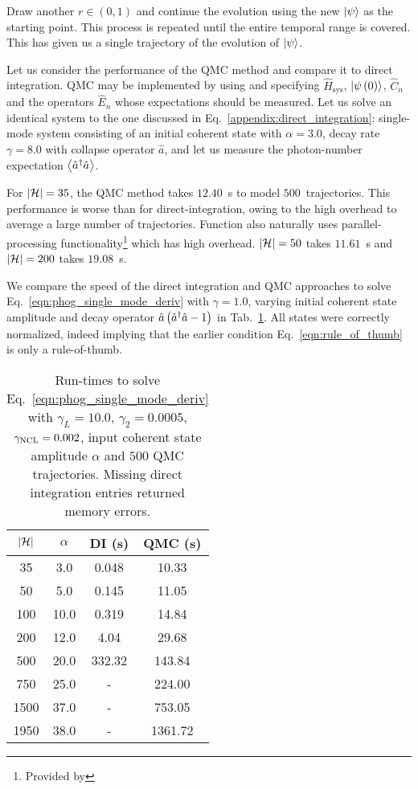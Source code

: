 \noindent Draw another $r \in \left(0, 1\right)$ and continue the evolution using the new $\ket{\psi}$ as the starting point. This process is repeated until the entire temporal range is covered. This has given us a single trajectory of the evolution of $\ket{\psi}$. 

Let us consider the performance of the QMC method and compare it to direct integration. QMC may be implemented by using  and specifying $\hat{H}_{\text{sys}}$, $\ket{\psi\left(0\right)}$, $\hat{C}_n$ and the operators $\hat{E}_n$ whose expectations should be measured. Let us solve an identical system to the one discussed in Eq.~\ref{appendix:direct_integration}: single-mode system consisting of an initial coherent state with $\alpha = 3.0$, decay rate $\gamma = 8.0$ with collapse operator $\hat{a}$, and let us measure the photon-number expectation $\ev{\hat{a}^\dagger \hat{a}}$. 

For $\left|\mathcal{H}\right| = 35$, the QMC method takes $12.40$~s to model $500$~trajectories. This performance is worse than for direct-integration, owing to the high overhead to average a large number of trajectories. Function  also naturally uses parallel-processing functionality\footnote{Provided by } which has high overhead. $\left|\mathcal{H}\right| = 50$ takes $11.61$~s and $\left|\mathcal{H}\right| = 200$ takes $19.08$~s.

We compare the speed of the direct integration and QMC approaches to solve Eq.~\ref{eqn:phog_single_mode_deriv} with $\gamma = 1.0$, varying initial coherent state amplitude and decay operator $\hat{a}\left(\hat{a}^\dagger \hat{a} - 1\right)$ in Tab.~\ref{table:numerical_methods}. All states were correctly normalized, indeed implying that the earlier condition Eq.~\ref{eqn:rule_of_thumb} is only a rule-of-thumb.

\begin{table}[htp]
\begin{tabular}{|c|c|c|c|}
\hline 
$\left|\mathcal{H}\right|$ & $\alpha$ & DI (s) & QMC (s) \\ 
\hline
\hline 
35 & 3.0 & 0.048 & 10.33 \\ 
\hline 
50 & 5.0 & 0.145 & 11.05 \\ 
\hline 
100 & 10.0 & 0.319 & 14.84 \\ 
\hline 
200 & 12.0 & 4.04 & 29.68 \\ 
\hline 
500 & 20.0 & 332.32 & 143.84 \\ 
\hline 
750 & 25.0 & - & 224.00 \\ 
\hline 
1500 & 37.0 & - & 753.05 \\ 
\hline 
1950 & 38.0 & - & 1361.72 \\ 
\hline 
\end{tabular} 
\caption{\label{table:numerical_methods} Run-times to solve Eq.~\ref{eqn:phog_single_mode_deriv} with $\gamma_L = 10.0$, $\gamma_2 = 0.0005$, $\gamma_{\text{NCL}} = 0.002$, input coherent state amplitude $\alpha$ and $500$ QMC trajectories. Missing direct integration entries returned memory errors.}
\end{table}


